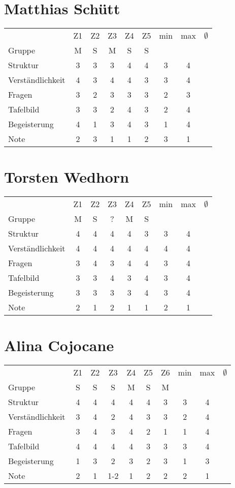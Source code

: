 \documentclass[a4paper]{article}
\begin{document}
\section{Matthias Sch\"utt}
\begin{tabular}{l|ccccc|cc|c}
&Z1&Z2&Z3&Z4&Z5&min&max&$\emptyset$\\
Gruppe               &M&S&M&S&S\\
\hline
Struktur             &3&3&3&4&4&3&4\\
Verst\"andlichkeit   &4&3&4&4&3&3&4\\
Fragen               &3&2&3&3&3&2&3\\
Tafelbild            &3&3&2&4&3&2&4\\
Begeisterung         &4&1&3&4&3&1&4\\
\hline
Note                 &2&3&1&1&2&3&1
\end{tabular}

\section{Torsten Wedhorn}
\begin{tabular}{l|ccccc|cc|c}
&Z1&Z2&Z3&Z4&Z5&min&max&$\emptyset$\\
Gruppe               &M&S&?&M&S\\
\hline
Struktur             &4&4&4&4&3&3&4\\
Verst\"andlichkeit   &4&4&4&4&4&4&4\\
Fragen               &3&4&3&4&4&3&4\\
Tafelbild            &3&3&4&3&4&3&4\\
Begeisterung         &3&3&3&3&4&3&4\\
\hline
Note                 &2&1&2&1&1&2&1
\end{tabular}

\section{Alina Cojocane}
\begin{tabular}{l|cccccc|cc|c}
&Z1&Z2&Z3&Z4&Z5&Z6&min&max&$\emptyset$\\
Gruppe               &S&S&S&M&S&M\\
\hline
Struktur             &4&4&4&4&4&3&3&4\\
Verst\"andlichkeit   &3&4&2&4&3&3&2&4\\
Fragen               &3&4&3&4&2&1&1&4\\
Tafelbild            &4&4&4&4&3&3&3&4\\
Begeisterung         &1&3&2&3&2&3&1&3\\
\hline
Note                 &2&1&1-2&1&2&2&2&1
\end{tabular}
\end{document}
